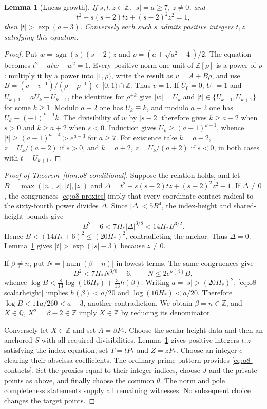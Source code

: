 \documentclass[11pt]{article}
\newtheorem{lemma}[theorem]{Lemma}
\theoremstyle{definition}
\theoremstyle{remark}
\newcommand{\Q}{\mathbb Q}
\newcommand{\Z}{\mathbb Z}
\begin{document}
\begin{lemma}[Lucas growth]\label{lem:o8-lucas}
If $s,t,z\in\Z$, $|s|=a\ge7$, $z\ne0$, and
\[
 t^2-s(s-2)tz+(s-2)^2z^2=1,
\]
then $|t|>\exp(a-3)$. Conversely each such $s$ admits positive
integers $t,z$ satisfying this equation.
\end{lemma}
\begin{proof}
Put $w=\operatorname{sgn}(s)(s-2)z$ and
$\rho=(a+\sqrt{a^2-4})/2$. The equation becomes
$t^2-atw+w^2=1$. Every positive norm-one unit of $\Z[\rho]$ is a
power of $\rho$: multiply it by a power into $[1,\rho)$, write the
result as $v=A+B\rho$, and use
$B=(v-v^{-1})/(\rho-\rho^{-1})\in[0,1)\cap\Z$.
Thus $v=1$. If $U_0=0$, $U_1=1$ and
$U_{k+1}=aU_k-U_{k-1}$, the identities for $\rho^{\pm k}$ give
$|w|=U_k$ and $|t|\in\{U_{k-1},U_{k+1}\}$ for some $k\ge1$.
Modulo $a-2$ one has $U_k\equiv k$, and modulo $a+2$ one has
$U_k\equiv(-1)^{k-1}k$. The divisibility of $w$ by $|s-2|$ therefore
gives $k\ge a-2$ when $s>0$ and $k\ge a+2$ when $s<0$.
Induction gives $U_k\ge(a-1)^{k-1}$, whence
$|t|\ge(a-1)^{a-4}>e^{a-3}$ for $a\ge7$.
For existence take $k=a-2$, $z=U_k/(a-2)$ if $s>0$, and
$k=a+2$, $z=U_k/(a+2)$ if $s<0$, in both cases with $t=U_{k+1}$.
\end{proof}

\begin{proof}[Proof of Theorem~\ref{thm:o8-conditional}]
Suppose the relation holds, and let
$B=\max(|n|,|s|,|t|,|z|)$ and
$\Delta=t^2-s(s-2)tz+(s-2)^2z^2-1$.
If $\Delta\ne0$, the congruences \eqref{eq:o8-proxies} imply that
every coordinate contact radical to the sixty-fourth power divides
$\Delta$. Since $|\Delta|<5B^4$, the index-height and shared-height
bounds give
\[
 B^2-6<7H_*|\Delta|^{3/8}<14H_*B^{3/2}.
\]
Hence $B<(14H_*+6)^2\le(20H_*)^2$, contradicting the anchor.
Thus $\Delta=0$. Lemma~\ref{lem:o8-lucas} gives
$|t|>\exp(|s|-3)$ because $z\ne0$.

If $\beta\ne n$, put $N=|\operatorname{num}(\beta-n)|$ in lowest
terms. The same congruences give
\[
 B^2<7H_*N^{3/8}+6,\qquad N\le2e^{h(\beta)}B,
\]
whence $\log B<\frac8{13}\log(16H_*)+\frac3{13}h(\beta)$.
Writing $a=|s|>(20H_*)^2$, \eqref{eq:o8-scalarheight} implies
$h(\beta)<a/20$ and $\log(16H_*)<a/20$. Therefore
$\log B<11a/260<a-3$, another contradiction.
We obtain $\beta=n\in\Z$, and $X\in\Q$, $X^2=\beta-2\in\Z$
imply $X\in\Z$ by reducing its denominator.

Conversely let $X\in\Z$ and set $A=\beta P_*$. Choose the scalar
height data and then an anchored $S$ with all required divisibilities.
Lemma~\ref{lem:o8-lucas} gives positive integers $t,z$ satisfying the
index equation; set $T=tP_*$ and $Z=zP_*$. Choose an integer $e$
clearing their abscissa coefficients. The ordinary prime pattern
provides \eqref{eq:o8-contacts}. Set the proxies equal to their integer
indices, choose $J$ and the private points as above, and finally choose
the common $\theta$. The norm and pole completeness statements supply
all remaining witnesses. No subsequent choice changes the target points.
\end{proof}
\end{document}
